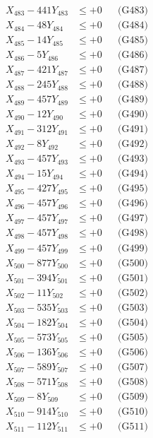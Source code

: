 \documentclass[a4paper,10pt]{article}
\begin{document}
{\begin{align}
X_{483} - 441Y_{483} &\leq +0 && \text{(G483)} \\
X_{484} - 48Y_{484} &\leq +0 && \text{(G484)} \\
X_{485} - 14Y_{485} &\leq +0 && \text{(G485)} \\
X_{486} - 5Y_{486} &\leq +0 && \text{(G486)} \\
X_{487} - 421Y_{487} &\leq +0 && \text{(G487)} \\
X_{488} - 245Y_{488} &\leq +0 && \text{(G488)} \\
X_{489} - 457Y_{489} &\leq +0 && \text{(G489)} \\
X_{490} - 12Y_{490} &\leq +0 && \text{(G490)} \\
\allowbreak
X_{491} - 312Y_{491} &\leq +0 && \text{(G491)} \\
X_{492} - 8Y_{492} &\leq +0 && \text{(G492)} \\
X_{493} - 457Y_{493} &\leq +0 && \text{(G493)} \\
X_{494} - 15Y_{494} &\leq +0 && \text{(G494)} \\
X_{495} - 427Y_{495} &\leq +0 && \text{(G495)} \\
X_{496} - 457Y_{496} &\leq +0 && \text{(G496)} \\
X_{497} - 457Y_{497} &\leq +0 && \text{(G497)} \\
X_{498} - 457Y_{498} &\leq +0 && \text{(G498)} \\
X_{499} - 457Y_{499} &\leq +0 && \text{(G499)} \\
X_{500} - 877Y_{500} &\leq +0 && \text{(G500)} \\
\allowbreak
X_{501} - 394Y_{501} &\leq +0 && \text{(G501)} \\
X_{502} - 11Y_{502} &\leq +0 && \text{(G502)} \\
X_{503} - 535Y_{503} &\leq +0 && \text{(G503)} \\
X_{504} - 182Y_{504} &\leq +0 && \text{(G504)} \\
X_{505} - 573Y_{505} &\leq +0 && \text{(G505)} \\
X_{506} - 136Y_{506} &\leq +0 && \text{(G506)} \\
X_{507} - 589Y_{507} &\leq +0 && \text{(G507)} \\
X_{508} - 571Y_{508} &\leq +0 && \text{(G508)} \\
X_{509} - 8Y_{509} &\leq +0 && \text{(G509)} \\
X_{510} - 914Y_{510} &\leq +0 && \text{(G510)} \\
\allowbreak
X_{511} - 112Y_{511} &\leq +0 && \text{(G511)} \\

\end{align}}
\end{document}
